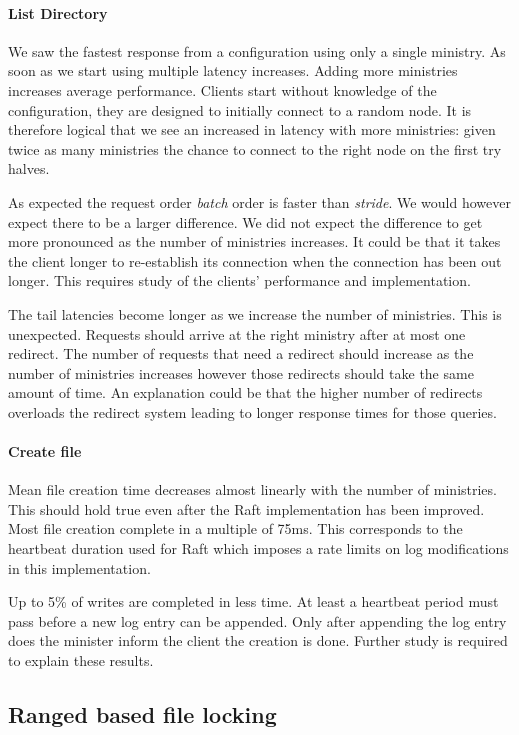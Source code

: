 \paragraph{List Directory}
We saw the fastest response from a \name{} configuration using only a single ministry. As soon as we start using multiple latency increases. Adding more ministries increases average performance. Clients start without knowledge of the configuration, they are designed to initially connect to a random node. It is therefore logical that we see an increased in latency with more ministries: given twice as many ministries the chance to connect to the right node on the first try halves. 

As expected the request order \textit{batch} order is faster than \textit{stride}. We would however expect there to be a larger difference. We did not expect the difference to get more pronounced as the number of ministries increases. It could be that it takes the client longer to re-establish its connection when the connection has been out longer. This requires study of the clients' performance and implementation.

The tail latencies become longer as we increase the number of ministries. This is unexpected. Requests should arrive at the right ministry after at most one redirect. The number of requests that need a redirect should increase as the number of ministries increases however those redirects should take the same amount of time. An explanation could be that the higher number of redirects overloads the redirect system leading to longer response times for those queries.
%
\paragraph{Create file} 
Mean file creation time decreases almost linearly with the number of ministries. This should hold true even after the Raft implementation has been improved. Most file creation complete in a multiple of 75ms. This corresponds to the heartbeat duration used for Raft which imposes a rate limits on log modifications in this implementation. 

Up to 5\% of writes are completed in less time. At least a heartbeat period must pass before a new log entry can be appended. Only after appending the log entry does the minister inform the client the creation is done. Further study is required to explain these results.
%
\subsection{Ranged based file locking}
